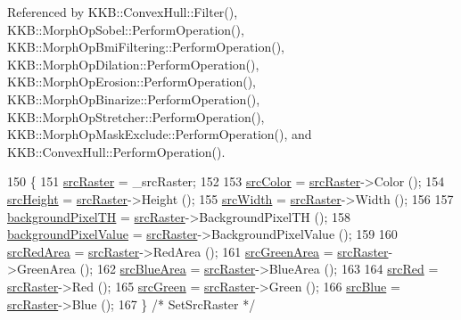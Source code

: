 Referenced by K\+K\+B\+::\+Convex\+Hull\+::\+Filter(), K\+K\+B\+::\+Morph\+Op\+Sobel\+::\+Perform\+Operation(), K\+K\+B\+::\+Morph\+Op\+Bmi\+Filtering\+::\+Perform\+Operation(), K\+K\+B\+::\+Morph\+Op\+Dilation\+::\+Perform\+Operation(), K\+K\+B\+::\+Morph\+Op\+Erosion\+::\+Perform\+Operation(), K\+K\+B\+::\+Morph\+Op\+Binarize\+::\+Perform\+Operation(), K\+K\+B\+::\+Morph\+Op\+Stretcher\+::\+Perform\+Operation(), K\+K\+B\+::\+Morph\+Op\+Mask\+Exclude\+::\+Perform\+Operation(), and K\+K\+B\+::\+Convex\+Hull\+::\+Perform\+Operation().


\begin{DoxyCode}
150 \{
151   \hyperlink{class_k_k_b_1_1_morph_op_a9af0ebff0135d124c7d1d17e21c4d7e6}{srcRaster} = \_srcRaster;
152 
153   \hyperlink{class_k_k_b_1_1_morph_op_a0cecdeb8369c7ab2689fbd9f997472b0}{srcColor}   = \hyperlink{class_k_k_b_1_1_morph_op_a9af0ebff0135d124c7d1d17e21c4d7e6}{srcRaster}->Color  ();
154   \hyperlink{class_k_k_b_1_1_morph_op_a54b2ce1b398a80803b4dbe8aef956b51}{srcHeight}  = \hyperlink{class_k_k_b_1_1_morph_op_a9af0ebff0135d124c7d1d17e21c4d7e6}{srcRaster}->Height ();
155   \hyperlink{class_k_k_b_1_1_morph_op_aec2cfb3015497e4077751fc5f19559ab}{srcWidth}   = \hyperlink{class_k_k_b_1_1_morph_op_a9af0ebff0135d124c7d1d17e21c4d7e6}{srcRaster}->Width  ();
156 
157   \hyperlink{class_k_k_b_1_1_morph_op_a0f9e76c2f2c45f0563567c49cd69a43b}{backgroundPixelTH}    = \hyperlink{class_k_k_b_1_1_morph_op_a9af0ebff0135d124c7d1d17e21c4d7e6}{srcRaster}->BackgroundPixelTH    ();
158   \hyperlink{class_k_k_b_1_1_morph_op_a0c3862d1c8427c4d246e0bcd56699741}{backgroundPixelValue} = \hyperlink{class_k_k_b_1_1_morph_op_a9af0ebff0135d124c7d1d17e21c4d7e6}{srcRaster}->BackgroundPixelValue ();
159 
160   \hyperlink{class_k_k_b_1_1_morph_op_acd1f255803231ecfabc0609685e56abe}{srcRedArea}   = \hyperlink{class_k_k_b_1_1_morph_op_a9af0ebff0135d124c7d1d17e21c4d7e6}{srcRaster}->RedArea   ();
161   \hyperlink{class_k_k_b_1_1_morph_op_a1a3372b8645c297f21c5805707aef8a0}{srcGreenArea} = \hyperlink{class_k_k_b_1_1_morph_op_a9af0ebff0135d124c7d1d17e21c4d7e6}{srcRaster}->GreenArea ();
162   \hyperlink{class_k_k_b_1_1_morph_op_a52fcf660b2173a2b6e8988ed23cf638c}{srcBlueArea}  = \hyperlink{class_k_k_b_1_1_morph_op_a9af0ebff0135d124c7d1d17e21c4d7e6}{srcRaster}->BlueArea  ();
163 
164   \hyperlink{class_k_k_b_1_1_morph_op_a4d790e4b71cfdaecee876879663dfdb4}{srcRed}   = \hyperlink{class_k_k_b_1_1_morph_op_a9af0ebff0135d124c7d1d17e21c4d7e6}{srcRaster}->Red   ();
165   \hyperlink{class_k_k_b_1_1_morph_op_ab811c702f7e0c8ffccdd21111c8144ab}{srcGreen} = \hyperlink{class_k_k_b_1_1_morph_op_a9af0ebff0135d124c7d1d17e21c4d7e6}{srcRaster}->Green ();
166   \hyperlink{class_k_k_b_1_1_morph_op_ad11edf2de07634c4c68df9a2e74cfd6c}{srcBlue}  = \hyperlink{class_k_k_b_1_1_morph_op_a9af0ebff0135d124c7d1d17e21c4d7e6}{srcRaster}->Blue  ();
167 \}  \textcolor{comment}{/* SetSrcRaster */}
\end{DoxyCode}


